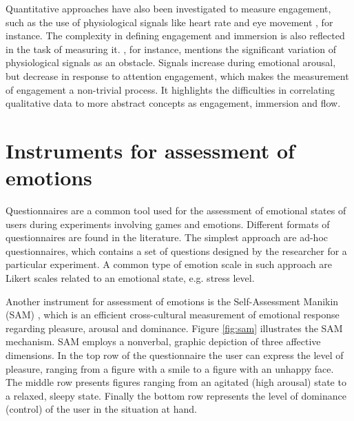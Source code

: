 Quantitative approaches have also been investigated to measure engagement, such as the use of physiological signals like heart rate \parencite{ravaja20051} and eye movement \parencite{jennett2008measuring}, for instance. The complexity in defining engagement and immersion is also reflected in the task of measuring it. \textcite{ravaja20051}, for instance, mentions the significant variation of physiological signals as an obstacle. Signals increase during emotional arousal, but decrease in response to attention engagement, which makes the measurement of engagement a non-trivial process. It highlights the difficulties in correlating qualitative data to more abstract concepts as engagement, immersion and flow.


\section{Instruments for assessment of emotions}

Questionnaires are a common tool used for the assessment of emotional states of users during experiments involving games and emotions. Different formats of questionnaires are found in the literature. The simplest approach are ad-hoc questionnaires, which contains a set of questions designed by the researcher for a particular experiment. A common type of emotion scale in such approach are Likert scales related to an emotional state, e.g. stress level.

Another instrument for assessment of emotions is the Self-Assessment Manikin (SAM) \parencite{morris1995observations}, which is an efficient cross-cultural measurement of emotional response regarding pleasure, arousal and dominance. Figure \ref{fig:sam} illustrates the SAM mechanism. SAM employs a nonverbal, graphic depiction of three affective dimensions. In the top row of the questionnaire the user can express the level of pleasure, ranging from a figure with a smile to a figure with an unhappy face. The middle row presents figures ranging from an agitated (high arousal) state to a relaxed, sleepy state. Finally the bottom row represents the level of dominance (control) of the user in the situation at hand.

